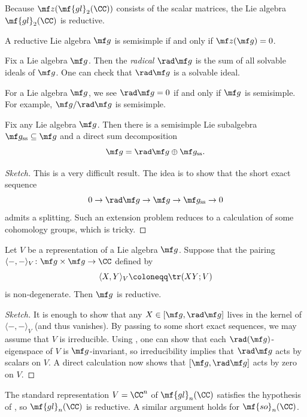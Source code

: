 \documentclass{article}
\begin{document}
\begin{example}
	Because $\mf z(\mf{gl}_2(\CC))$ consists of the scalar matrices, the Lie algebra $\mf{gl}_2(\CC)$ is reductive.
\end{example}
\begin{remark}
	A reductive Lie algebra $\mf g$ is semisimple if and only if $\mf z(\mf g)=0$.
\end{remark}
\begin{definition}[radical]
	Fix a Lie algebra $\mf g$. Then the \textit{radical} $\rad\mf g$ is the sum of all solvable ideals of $\mf g$. One can check that $\rad\mf g$ is a solvable ideal.
\end{definition}
\begin{example}
	For a Lie algebra $\mf g$, we see $\rad\mf g=0$ if and only if $\mf g$ is semisimple. For example, $\mf g/\rad\mf g$ is semisimple.
\end{example}
\begin{theorem} \label{thm:levi}
	Fix any Lie algebra $\mf g$. Then there is a semisimple Lie subalgebra $\mf g_{\mathrm{ss}}\subseteq\mf g$ and a direct sum decomposition
	\[\mf g=\rad\mf g\oplus\mf g_{\mathrm{ss}}.\]
\end{theorem}
\begin{proof}[Sketch]
	This is a very difficult result. The idea is to show that the short exact sequence
	\[0\to\rad\mf g\to\mf g\to\mf g_{\mathrm{ss}}\to0\]
	admits a splitting. Such an extension problem reduces to a calculation of some cohomology groups, which is tricky.
\end{proof}
\begin{proposition} \label{prop:get-reductive}
	Let $V$ be a representation of a Lie algebra $\mf g$. Suppose that the pairing $\langle-,-\rangle_V\colon\mf g\times\mf g\to\CC$ defined by
	\[\langle X,Y\rangle_V\coloneqq\tr(XY;V)\]
	is non-degenerate. Then $\mf g$ is reductive.
\end{proposition}
\begin{proof}[Sketch]
	It is enough to show that any $X\in[\mf g,\rad\mf g]$ lives in the kernel of $\langle-,-\rangle_V$ (and thus vanishes). By passing to some short exact sequences, we may assume that $V$ is irreducible. Using , one can show that each $\rad(\mf g)$-eigenspace of $V$ is $\mf g$-invariant, so irreducibility implies that $\rad\mf g$ acts by scalars on $V$. A direct calculation now shows that $[\mf g,\rad\mf g]$ acts by zero on $V$.
\end{proof}
\begin{example}
	The standard representation $V=\CC^n$ of $\mf{gl}_n(\CC)$ satisfies the hypothesis of , so $\mf{gl}_n(\CC)$ is reductive. A similar argument holds for $\mf{so}_n(\CC)$.
\end{example}
\end{document}
